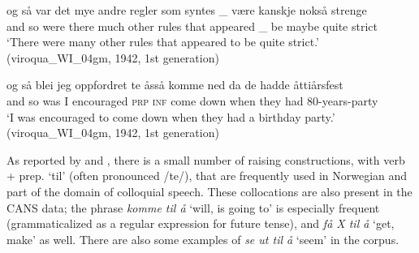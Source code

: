 \documentclass[output=paper,colorlinks,citecolor=brown]{langscibook}
\begin{document}
\begin{exe} 

\item \label{raisingFormal}

\begin{xlist}

\item \label{raisingOld1} \gll og så var det mye andre regler som syntes \_ være kanskje nokså strenge \\
        and so were there much other rules that appeared \_ be maybe quite strict \\
         \glt `There were many other rules that appeared to be quite strict.' \hfill(viroqua\_WI\_04gm, 1942, 1st generation)

\item \label{raisingOld2} \gll og så blei jeg oppfordret te åsså komme ned da de hadde åttiårsfest \\
        and so was I encouraged \textsc{prp} \textsc{inf} come down when they had 80-years-party \\
         \glt `I was encouraged to come down when they had a birthday party.' \hfill(viroqua\_WI\_04gm, 1942, 1st generation)

\end{xlist}
\end{exe}


As reported by \citet{lodrup2002} and \citet{faarlund19}, there is a small number of raising constructions, with verb + prep. `til' (often pronounced /te/), that are frequently used in Norwegian and part of the domain of colloquial speech. These collocations are also present in the CANS data; the phrase \textit{komme til å} `will, is going to' is especially frequent (grammaticalized as a regular expression for future tense), and \textit{få X til å} `get, make' as well. There are also some examples of \textit{se ut til å} `seem' in the corpus.
\end{document}
